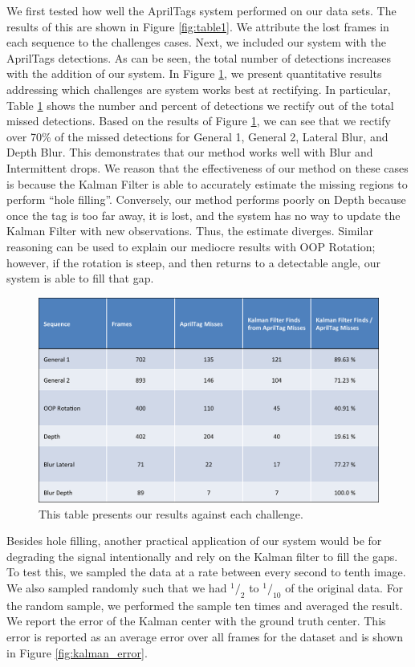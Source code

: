 \documentclass[letterpaper,10pt,conference]{IEEEtran}
\begin{document}
We first tested how well the AprilTags system performed on our data sets. The results of this are shown in Figure \ref{fig:table1}. We attribute the lost frames in each sequence to the challenges cases. Next, we included our system with the AprilTags detections. As can be seen, the total number of detections increases with the addition of our system. In Figure \ref{fig:table2}, we present quantitative results addressing which challenges are system works best at rectifying. In particular, Table \ref{fig:table2} shows the number and percent of detections we rectify out of the total missed detections. Based on the results of Figure \ref{fig:table2}, we can see that we rectify over 70\% of the missed detections for General 1, General 2, Lateral Blur, and Depth Blur. This demonstrates that our method works well with Blur and Intermittent drops. We reason that the effectiveness of our method on these cases is because the Kalman Filter is able to accurately estimate the missing regions to perform ``hole filling''. Conversely, our method performs poorly on Depth because once the tag is too far away, it is lost, and the system has no way to update the Kalman Filter with new observations. Thus, the estimate diverges. Similar reasoning can be used to explain our mediocre results with OOP Rotation; however, if the rotation is steep, and then returns to a detectable angle, our system is able to fill that gap.

\begin{figure}
\centering
\includegraphics[scale=.4]{table2}
\caption{This table presents our results against each challenge.}
\label{fig:table2}
\end{figure}

Besides hole filling, another practical application of our system would be for degrading the signal intentionally and rely on the Kalman filter to fill the gaps. To test this, we sampled the data at a rate between every second to tenth image.  We also sampled randomly such that we had $^1/_2$ to $^1/_{10}$ of the original data.  For the random sample, we performed the sample ten times and averaged the result. We report the error of the Kalman center with the ground truth center.  This error is reported as an average error over all frames for the dataset and is shown in Figure \ref{fig:kalman_error}.
\end{document}
